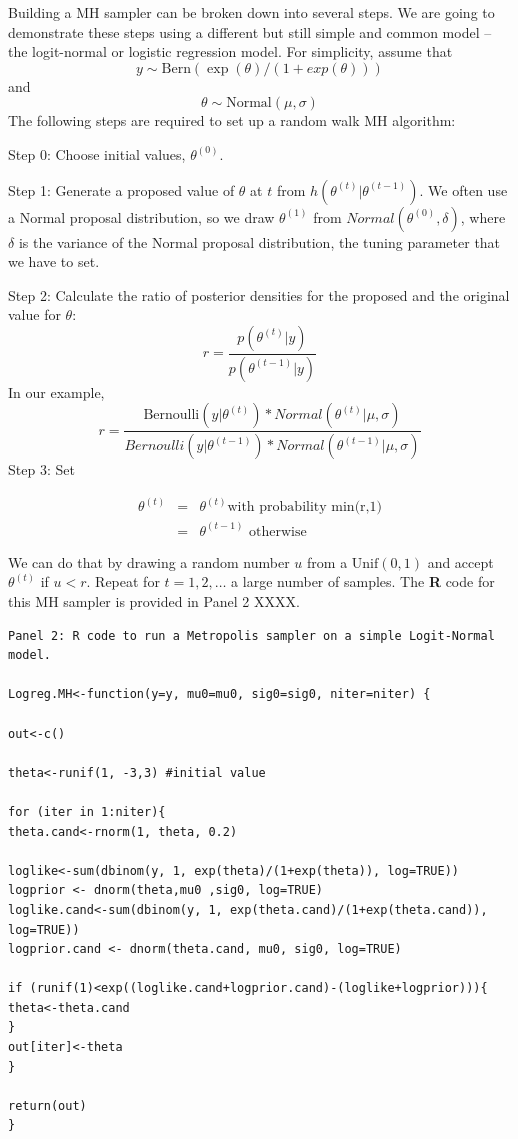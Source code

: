 Building a MH sampler can be broken down into several steps. We are going to demonstrate these steps using a different but still simple and common model – the logit-normal or logistic regression model. For simplicity, assume that
\[
y \sim \mbox{Bern}(\exp(\theta)/(1+ exp(\theta)))
\]
and
\[
\theta \sim \mbox{Normal}(\mu, \sigma)
\]
The following steps are required to set up a random walk MH algorithm:

{\flushleft Step 0: Choose initial values, $\theta^{(0)}$.}

{\flushleft Step 1: Generate a proposed value of $\theta$ at $t$ from $h(\theta^{(t)}|\theta^{(t-1)})$. }
We often use a Normal proposal distribution, so we draw $\theta^{(1)}$ from $Normal(\theta^{(0)}, \delta)$, where $\delta$ is the variance of the Normal proposal distribution, the tuning parameter that we have to set.

{\flushleft Step 2: Calculate the ratio of posterior densities for the proposed and the original value for $\theta$: }
\[
r = \frac{p(\theta^{(t)}|y)}  {p(\theta^{(t-1)}|y)}
\]
In our example,
\[
r = \frac{\mbox{Bernoulli}(y|\theta^{(t)}) * Normal(\theta^{(t)}|\mu, \sigma)} {Bernoulli(y|\theta^{(t-1)}) * Normal(\theta^{(t-1)}|\mu, \sigma)}
\]
Step 3: Set

\begin{eqnarray*}
\theta^{(t)}  &= &   \theta^{(t)} \mbox{with probability min(r,1)}\\
	 & = & 	\theta^{(t-1)} \mbox{ otherwise }
\end{eqnarray*}



We can do that by drawing a random number $u$ from a
$\mbox{Unif}(0,1)$ and accept $\theta^{(t)}$ if
$u<r$.
Repeat for $t = 1,2,\ldots$ a large number of samples.
The {\bf R} code for this MH sampler is provided in Panel 2 XXXX.
{\small
\begin{verbatim}
Panel 2: R code to run a Metropolis sampler on a simple Logit-Normal model.

Logreg.MH<-function(y=y, mu0=mu0, sig0=sig0, niter=niter) {

out<-c()

theta<-runif(1, -3,3) #initial value

for (iter in 1:niter){
theta.cand<-rnorm(1, theta, 0.2)

loglike<-sum(dbinom(y, 1, exp(theta)/(1+exp(theta)), log=TRUE))
logprior <- dnorm(theta,mu0 ,sig0, log=TRUE)
loglike.cand<-sum(dbinom(y, 1, exp(theta.cand)/(1+exp(theta.cand)), log=TRUE))
logprior.cand <- dnorm(theta.cand, mu0, sig0, log=TRUE)

if (runif(1)<exp((loglike.cand+logprior.cand)-(loglike+logprior))){
theta<-theta.cand
}
out[iter]<-theta
}

return(out)
}
\end{verbatim}
}

